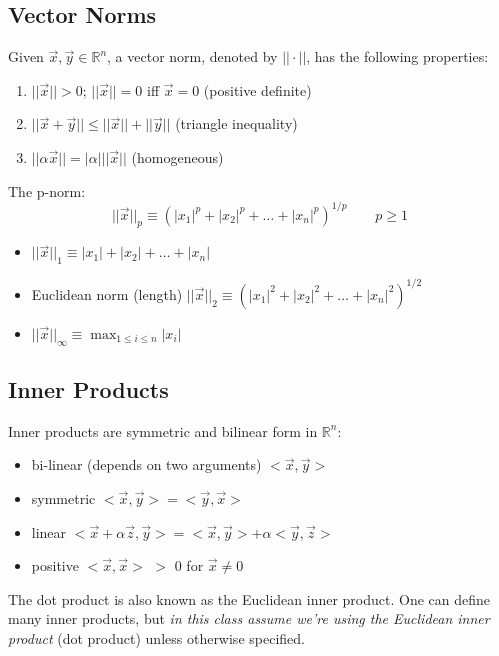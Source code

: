 \documentclass[12pt]{article}
\begin{document}
\subsection{Vector Norms}
Given $\vec{x}, \vec{y} \in \mathbb{R}^n$, a vector norm, denoted by $|| \cdot ||$, has the following properties:
%
\begin{enumerate}
\item $||\vec{x}|| > 0$; $||\vec{x}|| = 0$ iff $\vec{x} = 0$ (positive definite)
\item $||\vec{x} + \vec{y}|| \leq ||\vec{x}|| + ||\vec{y}||$ (triangle inequality)
\item $||\alpha \vec{x}|| = |\alpha| ||\vec{x}||$ (homogeneous)
\end{enumerate}

The p-norm:
%
\begin{equation}
||\vec{x}||_p \equiv (|x_1|^p + |x_2|^p + \dots + |x_n|^p)^{1/p} \qquad p \geq 1 \nonumber
\end{equation}
%
\begin{itemize}
\item $||\vec{x}||_1 \equiv |x_1| + |x_2| + \dots + |x_n|$
\item Euclidean norm (length) $||\vec{x}||_2 \equiv (|x_1|^2 + |x_2|^2 + \dots + |x_n|^2)^{1/2}$
\item $||\vec{x}||_{\infty} \equiv \displaystyle \max_{1 \leq i \leq n} |x_i|$
\end{itemize}

\subsection{Inner Products}
Inner products are symmetric and bilinear form in $\mathbb{R}^n$:
%
\begin{itemize}
\item bi-linear (depends on two arguments) $< \vec{x}, \vec{y} >$
\item symmetric $< \vec{x}, \vec{y} > = < \vec{y}, \vec{x} >$
\item linear $< \vec{x} + \alpha \vec{z}, \vec{y} > = < \vec{x}, \vec{y} > + \alpha < \vec{y}, \vec{z} >$
\item positive $< \vec{x}, \vec{x} >$ $>$ 0 for $\vec{x} \neq 0$
\end{itemize}

The dot product is also known as the Euclidean inner product. One can define many inner products, but \textit{in this class assume we're using the Euclidean inner product} (dot product) unless otherwise specified. 
\end{document}
